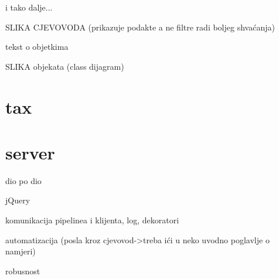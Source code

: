 i tako dalje...


SLIKA CJEVOVODA 
\label{fig:cjevovod}
(prikazuje podakte a ne filtre radi boljeg shvaćanja)

tekst o objetkima

SLIKA objekata (class dijagram)


\section{tax}

\section{server}
\label{sec:server}
    dio po dio

    jQuery

    komunikacija pipelinea i klijenta, log, dekoratori

automatizacija (posla kroz cjevovod->treba ići u neko uvodno poglavlje o namjeri)

robusnost
